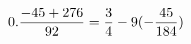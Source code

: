 \documentclass[preview]{standalone}
\begin{document}
\begin{align*}
\special{dvisvgm:raw <g id='unique000'>}0. \frac{-45 + 276}{92} = \frac{3}{4} - 9(- \frac{45}{184})\special{dvisvgm:raw </g>}
\end{align*}
\end{document}
